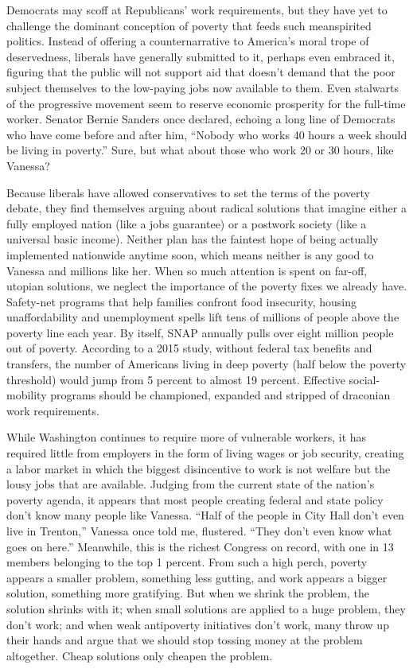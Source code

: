 Democrats may scoff at Republicans' work requirements, but they have yet
to challenge the dominant conception of poverty that feeds such
meanspirited politics. Instead of offering a counternarrative to
America's moral trope of deservedness, liberals have generally submitted
to it, perhaps even embraced it, figuring that the public will not
support aid that doesn't demand that the poor subject themselves to the
low-paying jobs now available to them. Even stalwarts of the progressive
movement seem to reserve economic prosperity for the full-time worker.
Senator Bernie Sanders once declared, echoing a long line of Democrats
who have come before and after him, ``Nobody who works 40 hours a week
should be living in poverty.'' Sure, but what about those who work 20 or
30 hours, like Vanessa?

Because liberals have allowed conservatives to set the terms of the
poverty debate, they find themselves arguing about radical solutions
that imagine either a fully employed nation (like a jobs guarantee) or a
postwork society (like a universal basic income). Neither plan has the
faintest hope of being actually implemented nationwide anytime soon,
which means neither is any good to Vanessa and millions like her. When
so much attention is spent on far-off, utopian solutions, we neglect the
importance of the poverty fixes we already have. Safety-net programs
that help families confront food insecurity, housing unaffordability and
unemployment spells lift tens of millions of people above the poverty
line each year. By itself, SNAP annually pulls over eight million people
out of poverty. According to a 2015 study, without federal tax benefits
and transfers, the number of Americans living in deep poverty (half
below the poverty threshold) would jump from 5 percent to almost 19
percent. Effective social-mobility programs should be championed,
expanded and stripped of draconian work requirements.

While Washington continues to require more of vulnerable workers, it has
required little from employers in the form of living wages or job
security, creating a labor market in which the biggest disincentive to
work is not welfare but the lousy jobs that are available. Judging from
the current state of the nation's poverty agenda, it appears that most
people creating federal and state policy don't know many people like
Vanessa. ``Half of the people in City Hall don't even live in Trenton,''
Vanessa once told me, flustered. ``They don't even know what goes on
here.'' Meanwhile, this is the richest Congress on record, with one in
13 members belonging to the top 1 percent. From such a high perch,
poverty appears a smaller problem, something less gutting, and work
appears a bigger solution, something more gratifying. But when we shrink
the problem, the solution shrinks with it; when small solutions are
applied to a huge problem, they don't work; and when weak antipoverty
initiatives don't work, many throw up their hands and argue that we
should stop tossing money at the problem altogether. Cheap solutions
only cheapen the problem.

